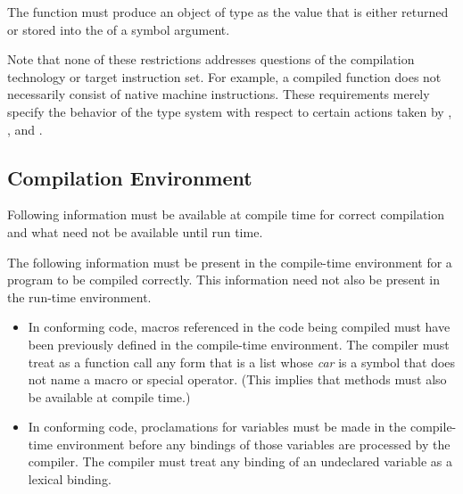 The function  must produce an object of type
       as the value that is either returned
or stored into the  of a symbol argument.

Note that none of these restrictions addresses questions of the compilation technology or
target instruction set.  For example, a compiled function does not necessarily consist of
native machine instructions.  These requirements merely specify the behavior of the type
system with respect to certain actions taken by , , and
.

\subsection{Compilation Environment}

Following information must be available at compile time
for correct compilation
and what need not be available until run time.

The following information must be present in the compile-time
environment for a program to be compiled correctly.  This
information need not also be present in the run-time environment.
\begin{itemize}
\item In conforming code, macros referenced in the code being compiled
        must have been previously defined in the compile-time environment.
	The compiler must treat as a function call any form that is a list whose \emph{car} is
	a symbol that does not name a macro or special operator.
  (This implies that  methods must also be available at
	compile time.)

\item In conforming code, proclamations for  variables must
        be made in the compile-time environment before any bindings of
        those variables are processed by the compiler.  The compiler
        must treat any binding of an undeclared variable as a lexical
        binding.
\end{itemize}


